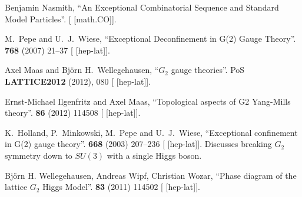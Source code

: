\begin{thebibliography}{99}
Benjamin Nasmith,
``An Exceptional Combinatorial Sequence and Standard Model Particles''.
[ [math.CO]].


M.~Pepe and U.~J.~Wiese,
``Exceptional Deconfinement in G(2) Gauge Theory''.
 \textbf{768} (2007) 21--37
{\tt{}}
[ [hep-lat]].

Axel Maas and Bj\"{o}rn H.~Wellegehausen,
``$G_2$ gauge theories''.
PoS \textbf{LATTICE2012} (2012), 080
{\tt{}}
[ [hep-lat]].

Ernst-Michael Ilgenfritz and Axel Maas,
``Topological aspects of G2 Yang-Mills theory''.
 \textbf{86} (2012) 114508
{\tt{}}
[ [hep-lat]].

K.~Holland, P.~Minkowski, M.~Pepe and U.~J.~Wiese,
``Exceptional confinement in G(2) gauge theory''.
 \textbf{668} (2003) 207--236
{\tt{}}
[ [hep-lat]].
Discusses breaking $G_{2}$ symmetry down to $SU(3)$ with a single Higgs boson.

Bj\"{o}rn H. Wellegehausen, Andreas Wipf, Christian Wozar,
``Phase diagram of the lattice $G_2$ Higgs Model''.
 \textbf{83} (2011) 114502
{\tt{}}
[ [hep-lat]].

\end{thebibliography}

